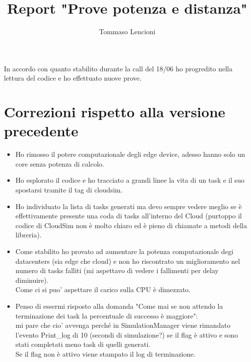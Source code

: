 \documentclass[12pt, a4paper]{report} %
\title{Report "Prove potenza e distanza"}
\author{Tommaso Lencioni}
\begin{document}
\maketitle
In accordo con quanto stabilito durante la call del 18/06 ho progredito nella lettura del codice e ho effettuato nuove prove.\\
\section*{Correzioni rispetto alla versione precedente}
 \begin{itemize}
 	\item Ho rimosso il potere computazionale degli edge device, adesso hanno solo un core senza potenza di calcolo.
 	\item Ho esplorato il codice e ho tracciato a grandi linee la vita di un task e il suo spostarsi tramite il tag di cloudsim.
 	\item Ho individuato la lista di tasks generati ma devo sempre vedere meglio se è effettivamente presente una coda di tasks all'interno del Cloud (purtoppo il codice di CloudSim non è molto chiaro ed è pieno di chiamate a metodi della libreria).
 	\item Come stabilito ho provato ad aumentare la potenza computazionale degi datacenters (sia edge che cloud) e non ho riscontrato un miglioramento nel numero di tasks falliti (mi aspettavo di vedere i fallimenti per delay diminuire).\\
 	Come ci si puo' aspettare il carico sulla CPU è dimezzato.
 	\item Penso di essermi risposto alla domanda "Come mai se non attendo la terminazione dei task la percentuale di successo è maggiore":\\
 	mi pare che cio' avvenga perché in SimulationManager viene rimandato l'evento Print\_log di 10 (secondi di simulazione?) se il flag è attivo e sono stati completati meno task di quelli generati.\\
Se il flag non è attivo viene stampato il log di terminazione.
 	\end{itemize}
\end{document}
